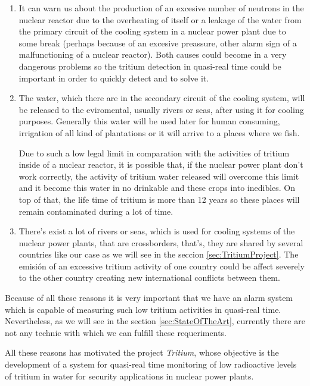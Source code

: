 \begin{enumerate}

\item{} It can warn us about the production of an excesive number of neutrons in the nuclear reactor due to the overheating of itself or a leakage of the water from the primary circuit of the cooling system in a nuclear power plant due to some break (perhaps because of an excesive preassure, other alarm sign of a malfunctioning of a nuclear reactor). Both causes could become in a very dangerous problems so the tritium detection in quasi-real time could be important in order to quickly detect and to solve it.

\item{} The water, which there are in the secondary circuit of the cooling system, will be released to the eviromental, usually rivers or seas, after using it for cooling purposes. Generally this water will be used later for human consuming, irrigation of all kind of plantations or it will arrive to a places where we fish. 

Due to such a low legal limit in comparation with the activities of tritium inside of a nuclear reactor, it is possible that, if the nuclear power plant don't work correctly, the activity of tritium water released will overcome this limit and it become this water in no drinkable and these crops into inedibles. On top of that, the life time of tritium is more than 12 years so these places will remain contaminated during a lot of time. 

\item{} There's exist a lot of rivers or seas, which is used for cooling systems of the nuclear power plants, that are crossborders, that's, they are shared by several countries like our case as we will see in the seccion \ref{sec:TritiumProject}. The emisión of an excessive tritium activity of one country could be affect severely to the other country creating new international conflicts between them.

\end{enumerate}

Because of all these reasons it is very important that we have an alarm system which is capable of measuring such low tritium activities in quasi-real time. Nevertheless, as we will see in the section \ref{sec:StateOfTheArt}, currently there are not any technic with which we can fulfill these requeriments.

All these reasons has motivated the project \textit{Tritium}, whose objective is the development of a system for quasi-real time monitoring of low radioactive levels of tritium in water for security applications in nuclear power plants.